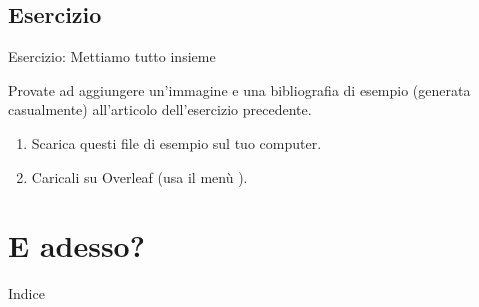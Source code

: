\documentclass{beamer}
\begin{document}
\subsection{Esercizio}
\begin{frame}[fragile]{Esercizio: Mettiamo tutto insieme}

Provate ad aggiungere un'immagine e una bibliografia di esempio (generata casualmente) all'articolo dell'esercizio precedente.

\begin{enumerate}
\item Scarica questi file di esempio sul tuo computer.

\begin{center}

\end{center}

\item Caricali su Overleaf (usa il men\`u ).

\end{enumerate}
\end{frame}

\section{E adesso?}

\begin{frame}{Indice}
\begin{multicols}{2}
\tableofcontents[currentsection]
\end{multicols}
\end{frame}
\end{document}

